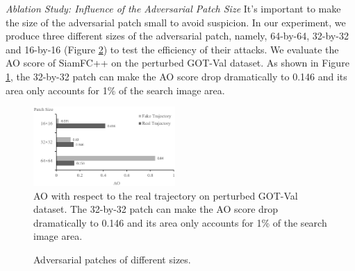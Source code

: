 \documentclass[journal]{IEEEtran}
\begin{document}
\textit{Ablation Study: Influence of the Adversarial Patch Size} 
It's important to make the size of the adversarial patch small to avoid suspicion. In our experiment, we produce three different sizes of the adversarial patch, namely, 64-by-64, 32-by-32 and 16-by-16 (Figure \ref{fig:patch_size_vis}) to test the efficiency of their attacks. We evaluate the AO score of SiamFC++ on the perturbed GOT-Val dataset.
As shown in Figure \ref{fig:patch_size_table}, the 32-by-32 patch can make the AO score drop dramatically to 0.146 and its area only accounts for 1\% of the search image area.

\begin{figure}[t!]
  \begin{center}
    \includegraphics[width=0.48\textwidth]{images_imperceptible/patch_size/patch_size.png}
  \end{center}
  \caption{AO with respect to the real trajectory on perturbed GOT-Val dataset. The 32-by-32 patch can make the AO score drop dramatically to 0.146 and its area only accounts for 1\% of the search image area.}
  \label{fig:patch_size_table}
\end{figure}

\begin{figure}
  \centering
  \caption{Adversarial patches of different sizes.}
  \label{fig:patch_size_vis}
\end{figure}
\end{document}

